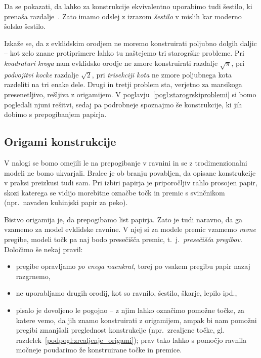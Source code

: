 \begin{opomba}
    \label{opom:solsko_sestilo}
    Da se pokazati, da lahko za konstrukcije ekvivalentno uporabimo tudi šestilo, ki prenaša razdalje~\cite[str.\ 6--7]{geometricconstructions}. Zato imamo odslej z izrazom \emph{šestilo} v mislih kar moderno šolsko šestilo.
\end{opomba}

Izkaže se, da z evklidskim orodjem ne moremo konstruirati poljubno dolgih daljic -- kot zelo znane protiprimere lahko tu naštejemo tri starogrške probleme. Pri \emph{kvadraturi kroga} nam evklidsko orodje ne zmore konstruirati razdalje $\sqrt{\pi}$, pri \emph{podvojitvi kocke} razdalje $\sqrt{2}$, pri \emph{trisekciji kota} ne zmore poljubnega kota razdeliti na tri enake dele. Drugi in tretji problem sta, verjetno za marsikoga presenetljivo, rešljiva z origamijem. V poglavju~\ref{pogl:starogrskiproblemi} si bomo pogledali njuni rešitvi, sedaj pa podrobneje spoznajmo še konstrukcije, ki jih dobimo s prepogibanjem papirja.

\subsection{Origami konstrukcije}
\label{origami_konstrukcije}

V nalogi se bomo omejili le na prepogibanje v ravnini in se z trodimenzionalni modeli ne bomo ukvarjali. Bralec je ob branju povabljen, da opisane konstrukcije v praksi preizkusi tudi sam. Pri izbiri papirja je priporočljiv rahlo prosojen papir, skozi katerega se vidijo morebitne označbe točk in premic s svinčnikom (npr.\ navaden kuhinjski papir za peko).

Bistvo origamija je, da prepogibamo list papirja. Zato je tudi naravno, da ga vzamemo za model evklidske ravnine. V njej si za modele premic vzamemo \emph{ravne} pregibe, modeli točk pa naj bodo presečišča premic, t.\ j.\ \emph{presečišča pregibov}. Določimo še nekaj pravil:
\begin{itemize}
    \item pregibe opravljamo \emph{po enega naenkrat}, torej po vsakem pregibu papir nazaj razgrnemo,
    \item ne uporabljamo drugih orodij, kot so ravnilo, šestilo, škarje, lepilo ipd.,
    \item pisalo je dovoljeno le pogojno -- z njim lahko označimo pomožne točke, za katere vemo, da jih znamo konstruirati z origamijem, ampak bi nam pomožni pregibi zmanjšali preglednost konstrukcije (npr.\ zrcaljene točke, gl. razdelek~\ref{podpogl:zrcaljenje_origami}); prav tako lahko s pomočjo ravnila močneje poudarimo že konstruirane točke in premice.
\end{itemize}

